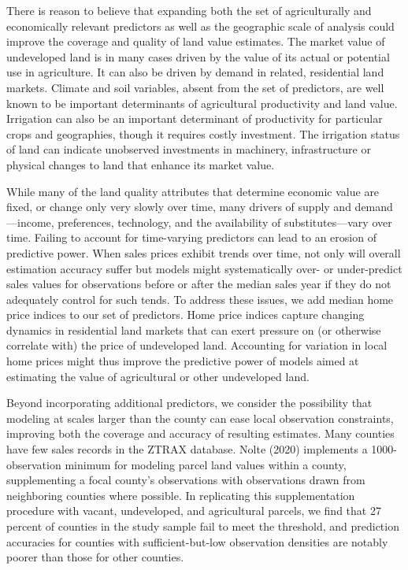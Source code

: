 \documentclass[12pt]{article}
\begin{document}
There is reason to believe that expanding both the set of agriculturally and economically relevant predictors as well as the geographic scale of analysis could improve the coverage and quality of land value estimates. The market value of undeveloped land is in many cases driven by the value of its actual or potential use in agriculture. It can also be driven by demand in related, residential land markets. Climate and soil variables, absent from the set of \textcite{Nolte2020High-resolutionStates} predictors, are well known to be important determinants of agricultural productivity and land value. Irrigation can also be an important determinant of productivity for particular crops and geographies, though it requires costly investment. The irrigation status of land can indicate unobserved investments in machinery, infrastructure or physical changes to land that enhance its market value. 

While many of the land quality attributes that determine economic value are fixed, or change only very slowly over time, many drivers of supply and demand—income, preferences, technology, and the availability of substitutes---vary over time. Failing to account for time-varying predictors can lead to an erosion of predictive power. When sales prices exhibit trends over time, not only will overall estimation accuracy suffer but models might systematically over- or under-predict sales values for observations before or after the median sales year if they do not adequately control for such tends. To address these issues, we add median home price indices to our set of predictors. Home price indices capture changing dynamics in residential land markets that can exert pressure on (or otherwise correlate with) the price of undeveloped land. Accounting for variation in local home prices might thus improve the predictive power of models aimed at estimating the value of agricultural or other undeveloped land. 

Beyond incorporating additional predictors, we consider the possibility that modeling at scales larger than the county can ease local observation constraints, improving both the coverage and accuracy of resulting estimates. Many counties have few sales records in the ZTRAX database. Nolte (2020) implements a 1000-observation minimum for modeling parcel land values within a county, supplementing a focal county’s observations with observations drawn from neighboring counties where possible. In replicating this supplementation procedure with vacant, undeveloped, and agricultural parcels, we find that 27 percent of counties in the study sample fail to meet the threshold, and prediction accuracies for counties with sufficient-but-low observation densities are notably poorer than those for other counties. 
\end{document}
